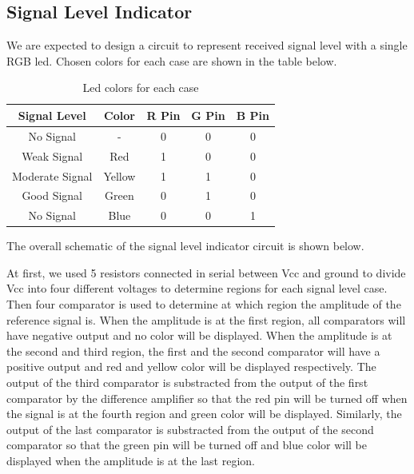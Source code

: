 \documentclass[conference]{IEEEtran}
\begin{document}
\subsection{Signal Level Indicator}
We are expected to design a circuit to represent received signal level with a single RGB led. Chosen colors for 
each case are shown in the table below.
\begin{table}[htbp]
    \caption{Led colors for each case}
    \begin{center}
    \begin{tabular}{|c|c|c|c|c|}
    \hline
    \textbf{Signal Level} & \textbf{Color}& \textbf{R Pin}& \textbf{G Pin}& \textbf{B Pin} \\
    \hline
    No Signal & - & 0 & 0 & 0\\
    \hline
    Weak Signal & Red & 1 & 0 & 0\\
    \hline
    Moderate Signal & Yellow & 1 & 1 & 0\\
    \hline
    Good Signal & Green & 0 & 1 & 0\\
    \hline
    No Signal & Blue & 0 & 0 & 1\\
    \hline
    \end{tabular}
    \label{tab1}
    \end{center}
\end{table}
The overall schematic of the signal level indicator circuit is shown below.
\par At first, we used 5 resistors connected in serial between Vcc and ground to divide Vcc into four different voltages 
to determine regions for each signal level case. 
Then four comparator is used to determine at which region the amplitude of the reference signal is. When the amplitude 
is at the first region, all comparators will have negative output and no color will be displayed. When the amplitude 
is at the second and third region, the first and the second comparator will have a positive output and red and yellow 
color will be displayed respectively. The output of the third comparator is substracted from the output of the first 
comparator by the difference amplifier so that the red pin will be turned off when the signal is at the fourth region 
and green color will be displayed. Similarly, the output of the last comparator is substracted from the output of the 
second comparator so that the green pin will be turned off and blue color will be displayed when the amplitude is at the 
last region.
\end{document}
